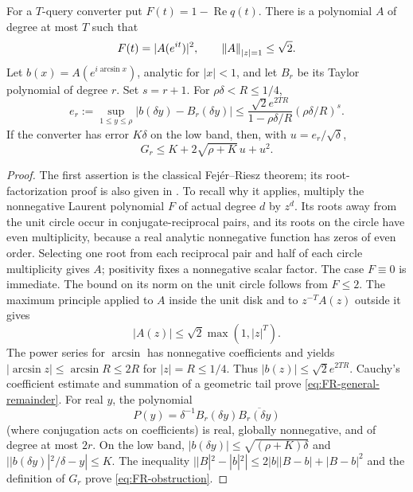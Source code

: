 \begin{lemma}\label{lem:FR-remainder}
For a $T$-query converter put $F(t)=1-\operatorname{Re}q(t)$. There is a polynomial $A$ of degree at most $T$ such that
\[
 F(t)=|A(e^{it})|^2,\qquad \left\lVert A\right\rVert_{|z|=1}\leq\sqrt2.
\]
Let $b(x)=A(e^{i\arcsin x})$, analytic for $|x|<1$, and let $B_r$ be its Taylor polynomial of degree $r$. Set $s=r+1$. For $\rho\delta<R\leq1/4$,
\begin{equation}\label{eq:FR-general-remainder}
 e_r:=\sup_{1\leq y\leq\rho}|b(\delta y)-B_r(\delta y)|
 \leq \frac{\sqrt2 e^{2TR}}{1-\rho\delta/R}
             (\rho\delta/R)^s.
\end{equation}
If the converter has error $K\delta$ on the low band, then, with $u=e_r/\sqrt\delta$,
\begin{equation}\label{eq:FR-obstruction}
 G_r\leq K+2\sqrt{\rho+K}\,u+u^2.
\end{equation}
\end{lemma}
\begin{proof}
The first assertion is the classical Fej\'er--Riesz theorem; its root-factorization proof is also given in \cite[proof of Theorem 4]{motlagh2024}. To recall why it applies, multiply the nonnegative Laurent polynomial $F$ of actual degree $d$ by $z^d$. Its roots away from the unit circle occur in conjugate-reciprocal pairs, and its roots on the circle have even multiplicity, because a real analytic nonnegative function has zeros of even order. Selecting one root from each reciprocal pair and half of each circle multiplicity gives $A$; positivity fixes a nonnegative scalar factor. The case $F\equiv0$ is immediate. The bound on its norm on the unit circle follows from $F\leq2$.
The maximum principle applied to $A$ inside the unit disk and to $z^{-T}A(z)$ outside it gives
\[
 |A(z)|\leq\sqrt2\max(1,|z|^T).
\]
The power series for $\arcsin$ has nonnegative coefficients and yields $|\arcsin z|\leq\arcsin R\leq2R$ for $|z|=R\leq1/4$. Thus $|b(z)|\leq\sqrt2e^{2TR}$. Cauchy's coefficient estimate and summation of a geometric tail prove \eqref{eq:FR-general-remainder}.
For real $y$, the polynomial
\[
 P(y)=\delta^{-1}B_r(\delta y)\overline{B_r(\delta y)}
\]
(where conjugation acts on coefficients) is real, globally nonnegative, and of degree at most $2r$. On the low band, $|b(\delta y)|\leq\sqrt{(\rho+K)\delta}$ and $||b(\delta y)|^2/\delta-y|\leq K$. The inequality $||B|^2-|b|^2|\leq2|b||B-b|+|B-b|^2$ and the definition of $G_r$ prove \eqref{eq:FR-obstruction}.
\end{proof}

